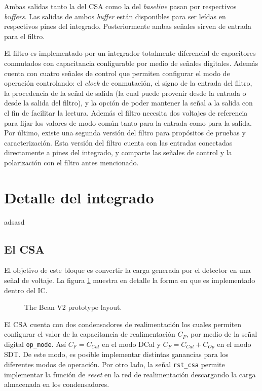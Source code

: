 Ambas salidas tanto la del CSA como la del \textit{baseline} pasan por respectivos \textit{buffers}. Las salidas de ambos \textit{buffer} están disponibles para ser leídas en respectivos pines del integrado. Posteriormente ambas señales sirven de entrada para el filtro.

El filtro es implementado por un integrador totalmente diferencial de capacitores conmutados con capacitancia configurable por medio de señales digitales. Además cuenta con cuatro señales de control que permiten configurar el modo de operación controlando: el \textit{clock} de conmutación, el signo de la entrada del filtro, la procedencia de la señal de salida (la cual puede provenir desde la entrada o desde la salida del filtro), y la opción de poder mantener la señal a la salida con el fin de facilitar la lectura. Además el filtro necesita dos voltajes de referencia para fijar los valores de modo común tanto para la entrada como para la salida.
	Por último, existe una segunda versión del filtro para propósitos de pruebas y caracterización. Esta versión del filtro cuenta con las entradas conectadas directamente a pines del integrado, y comparte las señales de control y la polarización con el filtro antes mencionado.
	
 	
	

\section{Detalle del integrado}
adsasd
\subsection{El CSA}

El objetivo de este bloque es convertir la carga generada por el detector en una señal de voltaje. La figura \ref{csa} muestra en detalle la forma en que es implementado dentro del IC. 

\begin{figure}[!h]
	\centering
	
	\caption{\label{csa}The Bean V2 prototype layout.}
\end{figure}

El CSA cuenta con dos condensadores de realimentación los cuales permiten configurar el valor de la capacitancia de realimentación $C_F$, por medio de la señal digital \verb+op_mode+. Así $C_F= C_{Cal}$ en el modo DCal y $C_F= C_{Cal}+ C_{Op}$ en el modo SDT. De este modo, es posible implementar distintas ganancias para los diferentes modos de operación. Por otro lado, la señal \verb+rst_csa+ permite implementar la función de \textit{reset} en la red de realimentación descargando la carga almacenada en los condensadores.

